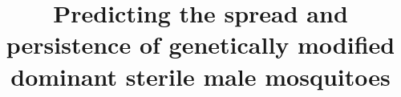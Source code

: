 \documentclass[]{bmcart}
\begin{document}
\begin{frontmatter}

\begin{fmbox}


\title{Predicting the spread and persistence of genetically modified dominant sterile male mosquitoes}


\author[
   addressref={aff1},                   %
   corref={aff1},                       %
   email={adrien.ickowicz@csiro.au}   %
]{ }
\author[
   addressref={aff1},
   email={scott.foster@csiro.au}
]{ }
\author[
   addressref={aff1},
   email={geoff.hosack@csiro.au}
]{ }
\author[
   addressref={aff1},
   email={keith.hayes@csiro.au}
]{ }

\address[id=aff1]{%
  , %
  ,                              %
}


\end{fmbox}
\end{frontmatter}
\end{document}
